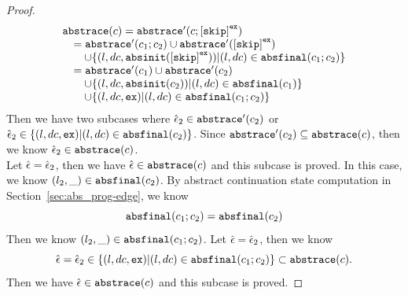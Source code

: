 \begin{proof}
\[      \begin{array}{l}
        \absflow(c) = \absflow'(c; \clabel{\eskip}^{\lex}) 
        \\ \quad
        = \absflow'(c_1;c_2) \cup \absflow'(\clabel{\eskip}^{\lex}) 
        \\ \qquad
        \cup \{ (l, dc, \absinit(\clabel{\eskip}^{\lex})) | (l, dc) \in \absfinal(c_1; c_2) \} 
        \\ \quad  
        = \absflow'(c_1) \cup \absflow'(c_2) 
        \\ \quad \quad
        \cup \{ (l, dc, \absinit(c_2)) | (l, dc) \in \absfinal(c_1) \} 
        \\ \quad \quad
        \cup \{ (l, dc, \lex) | (l, dc) \in \absfinal(c_1; c_2) \} 
     \end{array}
    \]
    Then we have two subcases where 
    $\hat{\mathtt{\epsilon}{}}_2 \in \mathtt{abs}{\mathtt{trace}}'(c_2)$ or $\hat{\mathtt{\epsilon}{}}_2 \in \{ (l, dc, \mathtt{ex}) | (l, dc) \in \mathtt{abs}{\mathtt{final}}(c_2) \}$.
    Since $\mathtt{abs}{\mathtt{trace}}'(c_2) \subseteq \mathtt{abs}{\mathtt{trace}}(c)$, then we know $\hat{\mathtt{\epsilon}{}}_2 \in \mathtt{abs}{\mathtt{trace}}(c)$.
    \\
    Let $\hat{\mathtt{\epsilon}{}} = \hat{\mathtt{\epsilon}{}}_2$, then we have $\hat{\mathtt{\epsilon}{}} \in \mathtt{abs}{\mathtt{trace}}(c)$ and this subcase is proved.
    In this case, we know $(l_2, \_) \in \mathtt{abs}{\mathtt{final}}(c_2)$. By abstract continuation state computation in Section~\ref{sec:abs_prog-edge}, we know
    \[
      \mathtt{abs}{\mathtt{final}}(c_1; c_2) =  \mathtt{abs}{\mathtt{final}}(c_2) 
    \]
    Then we know $(l_2, \_) \in \mathtt{abs}{\mathtt{final}}(c_1; c_2)$. Let $\hat{\mathtt{\epsilon}{}} = \hat{\mathtt{\epsilon}{}}_2$, then we know 
    \[
      \hat{\mathtt{\epsilon}{}} = \hat{\mathtt{\epsilon}{}}_2 \in   \{ (l, dc, \mathtt{ex}) | (l, dc) \in \mathtt{abs}{\mathtt{final}}(c_1; c_2) \}  \subset\mathtt{abs}{\mathtt{trace}}(c).
    \]
    Then we have $\hat{\mathtt{\epsilon}{}} \in \mathtt{abs}{\mathtt{trace}}(c)$ and this subcase is proved.
  \end{proof}
  

